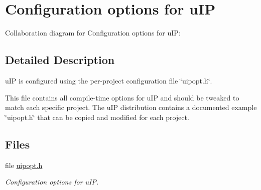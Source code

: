 \hypertarget{a00069}{
\section{Configuration options for u\-IP}
\label{a00069}
}


Collaboration diagram for Configuration options for u\-IP:

\subsection{Detailed Description}
u\-IP is configured using the per-project configuration file \char`\"{}uipopt.h\char`\"{}. 

This file contains all compile-time options for u\-IP and should be tweaked to match each specific project. The u\-IP distribution contains a documented example \char`\"{}uipopt.h\char`\"{} that can be copied and modified for each project. 

\subsection*{Files}
\begin{CompactItemize}
\item 
file \hyperlink{a00058}{uipopt.h}
\begin{CompactList}\small\item\em Configuration options for u\-IP. \item\end{CompactList}

\end{CompactItemize}
